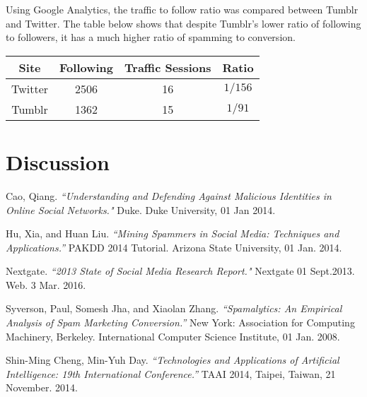 \documentclass{article}
\begin{document}
\vspace{0.5in}

\noindent
Using Google Analytics, the traffic to follow ratio was compared between Tumblr and Twitter. The table below shows that despite Tumblr's lower ratio of following to followers, it has a much higher ratio of spamming to conversion. 

\vspace{0.25in}

\begin{center}
\begin{tabular}{| c | c | c | c |}
  \hline
  Site & Following & Traffic Sessions & Ratio \\
  \hline
  Twitter & 2506 & 16 & $1/156$\\
  Tumblr & 1362 & 15 & $1/91$\\
  
  \hline
\end{tabular}
\end{center}

\newpage
\section{Discussion}
\newpage
\begin{thebibliography}{9}
Cao, Qiang. 
\textit{``Understanding and Defending Against Malicious Identities in Online Social 
Networks."} 
Duke. Duke University, 01 Jan 2014.

 Hu, Xia, and Huan Liu.
 \textit{``Mining Spammers in Social Media: Techniques and Applications.'' }
PAKDD 2014 Tutorial. Arizona State University, 01 Jan. 2014.

Nextgate.
\textit{``2013 State of Social Media Research Report."} 
Nextgate 01 Sept.2013. Web. 3 Mar. 2016.

Syverson, Paul, Somesh Jha, and Xiaolan Zhang.
\textit{``Spamalytics: An Empirical Analysis of Spam Marketing Conversion.''} 
New York: Association for Computing Machinery, Berkeley. International Computer Science Institute, 01 Jan. 2008.

Shin-Ming Cheng, Min-Yuh Day.
\textit{``Technologies and Applications of Artificial Intelligence: 19th International Conference.''}
TAAI 2014, Taipei, Taiwan, 21 November. 2014.
 
 
\end{thebibliography}
\end{document}
